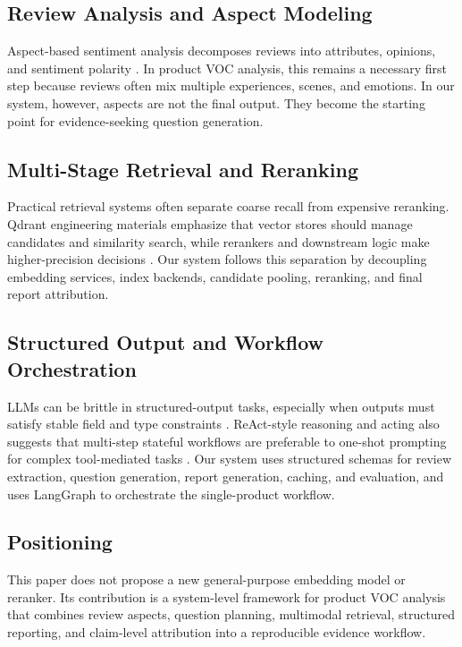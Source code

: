 \documentclass[11pt]{article}
\begin{document}
\subsection{Review Analysis and Aspect Modeling}

Aspect-based sentiment analysis decomposes reviews into attributes, opinions, and sentiment polarity \citep{pontiki2014semevalAspect}. In product VOC analysis, this remains a necessary first step because reviews often mix multiple experiences, scenes, and emotions. In our system, however, aspects are not the final output. They become the starting point for evidence-seeking question generation.

\subsection{Multi-Stage Retrieval and Reranking}

Practical retrieval systems often separate coarse recall from expensive reranking. Qdrant engineering materials emphasize that vector stores should manage candidates and similarity search, while rerankers and downstream logic make higher-precision decisions \citep{qdrant2024pdfRetrievalAtScale,qdrant2024multiVectorCourse}. Our system follows this separation by decoupling embedding services, index backends, candidate pooling, reranking, and final report attribution.

\subsection{Structured Output and Workflow Orchestration}

LLMs can be brittle in structured-output tasks, especially when outputs must satisfy stable field and type constraints \citep{liu2024structuredOutputBenchmark,geng2023grammarConstrainedDecoding}. ReAct-style reasoning and acting also suggests that multi-step stateful workflows are preferable to one-shot prompting for complex tool-mediated tasks \citep{yao2023react}. Our system uses structured schemas for review extraction, question generation, report generation, caching, and evaluation, and uses LangGraph to orchestrate the single-product workflow.

\subsection{Positioning}

This paper does not propose a new general-purpose embedding model or reranker. Its contribution is a system-level framework for product VOC analysis that combines review aspects, question planning, multimodal retrieval, structured reporting, and claim-level attribution into a reproducible evidence workflow.
\end{document}
